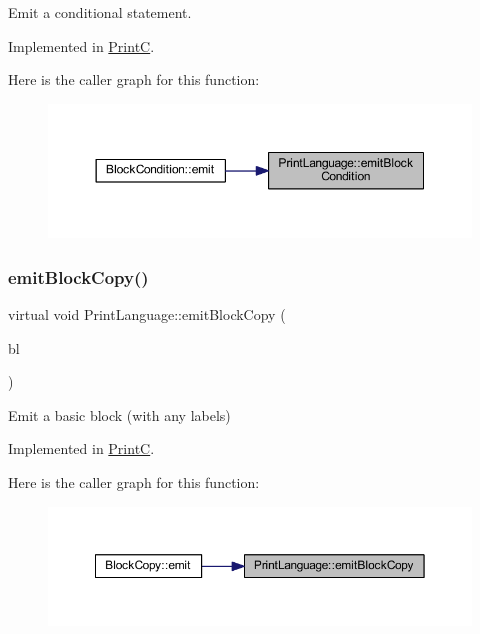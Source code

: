 Emit a conditional statement. 



Implemented in \mbox{\hyperlink{class_print_c_a9ecd552720351716158ab4f5085d950e}{PrintC}}.

Here is the caller graph for this function\+:
\nopagebreak
\begin{figure}[H]
\begin{center}
\leavevmode
\includegraphics[width=350pt]{class_print_language_a2c7e3165cd19c1949aaeeb08d4d4c576_icgraph}
\end{center}
\end{figure}
\mbox{\label{class_print_language_a64fafed976ae9f3e847ceba8459c51e0}} 
\subsubsection{\texorpdfstring{emitBlockCopy()}{emitBlockCopy()}}
{\footnotesize\ttfamily virtual void Print\+Language\+::emit\+Block\+Copy (\begin{DoxyParamCaption}\item[{const \mbox{\hyperlink{class_block_copy}{Block\+Copy}} $\ast$}]{bl }\end{DoxyParamCaption})\hspace{0.3cm}{\ttfamily [pure virtual]}}



Emit a basic block (with any labels) 



Implemented in \mbox{\hyperlink{class_print_c_a63589b8489cd26e45c2d01a76554999b}{PrintC}}.

Here is the caller graph for this function\+:
\nopagebreak
\begin{figure}[H]
\begin{center}
\leavevmode
\includegraphics[width=350pt]{class_print_language_a64fafed976ae9f3e847ceba8459c51e0_icgraph}
\end{center}
\end{figure}
\mbox{\label{class_print_language_a43bee19adc9bc933d1bd5845d614dc74}} 
